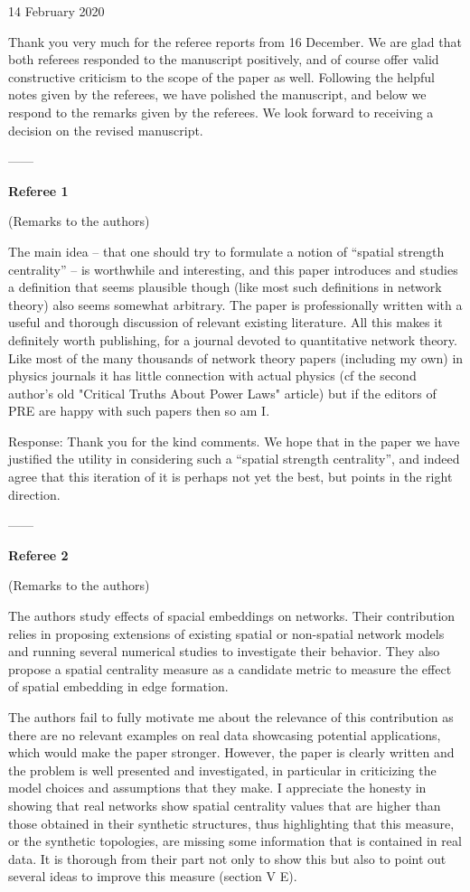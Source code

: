 \documentclass[12pt]{article}
\begin{document}
14 February 2020

Thank you very much for the referee reports from 16 December. We are glad that both referees responded to the manuscript positively, and of course offer valid constructive criticism to the scope of the paper as well. Following the helpful notes given by the referees, we have polished the manuscript, and below we respond to the remarks given by the referees. We look forward to receiving a decision on the revised manuscript.

------

\textbf{Referee 1}

(Remarks to the authors)

The main idea -- that one should try to formulate a notion of ``spatial
strength centrality'' -- is worthwhile and interesting, and this paper
introduces and studies a definition that seems plausible though (like
most such definitions in network theory) also seems somewhat
arbitrary. The paper is professionally written with a useful and
thorough discussion of relevant existing literature. All this makes it
definitely worth publishing, for a journal devoted to quantitative
network theory. Like most of the many thousands of network theory
papers (including my own) in physics journals it has little connection
with actual physics (cf the second author's old "Critical Truths About
Power Laws" article) but if the editors of PRE are happy with such
papers then so am I. 

{\color{res} Response: Thank you for the kind comments. We hope that in the paper we have justified the utility in considering such a ``spatial strength centrality'', and indeed agree that this iteration of it is perhaps not yet the best, but points in the right direction.}


------

\pagebreak


\textbf{Referee 2}

(Remarks to the authors)

The authors study effects of spacial embeddings on networks. Their contribution relies in
proposing extensions of existing spatial or non-spatial network models and running several
numerical studies to investigate their behavior. They also propose a spatial centrality
measure as a candidate metric to measure the effect of spatial embedding in edge formation.

The authors fail to fully motivate me about the relevance of this contribution as there are
no relevant examples on real data showcasing potential applications, which would make the
paper stronger. However, the paper is clearly written and the problem is well presented and
investigated, in particular in criticizing the model choices and assumptions that they make.
I appreciate the honesty in showing that real networks show spatial centrality values that are
higher than those obtained in their synthetic structures, thus highlighting that this measure,
or the synthetic topologies, are missing some information that is contained in real data. It is
thorough from their part not only to show this but also to point out several ideas to improve
this measure (section V E).
\end{document}
